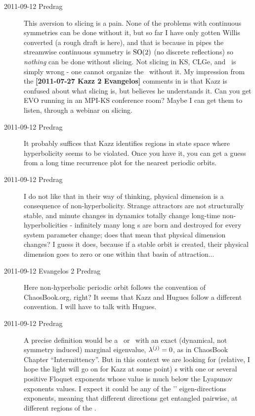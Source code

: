 \begin{description}
\item[2011-09-12 Predrag] This aversion to slicing is a pain. None of the
  problems with continuous symmetries can be done without it, but so far I
  have only gotten Willis converted
  {(a rough draft is here)}, and that is because in pipes the streamwise
  continuous symmetry is $\textrm{SO}(2)$ (no discrete reflections) so
  \emph{nothing} can be done without slicing. Not slicing in KS, CLGe, and
  \pCf\ is simply wrong - one cannot organize the \statesp\ without it. My
  impression from the {\bf [2011-07-27 Kazz 2 Evangelos]} comments in
   is that Kazz is confused about what slicing
  is, but believes he understands it. Can you get EVO running in an MPI-KS
  conference room? Maybe I can get them to listen, through a webinar on
  slicing.

\item[2011-09-12 Predrag] It probably suffices that Kazz identifies 	
  regions in state space where hyper\-bolicity seems to 	be violated. Once
  you have it, you can get a guess from a long time recurrence plot for the
  nearest periodic orbits.

\item[2011-09-12 Predrag] I do not like that in their way of thinking,
  physical dimension is a consequence of non-hyperbolicity. Strange
  attractors are not structurally stable, and minute changes in dynamics
  totally change long-time non-hyperbolicities - infinitely many long \po s
  are born and destroyed for every system parameter change; does that mean
  that physical dimension changes? I guess it does, because if a stable
  orbit is created, their physical dimension goes to zero or one within
  that basin of attraction...

\item[2011-09-12 Evangelos 2 Predrag] Here non-hyperbolic periodic orbit follows
  the convention of ChaosBook.org, right? It seems that Kazz and Hugues follow a
  different convention. I will have to talk with Hugues.

\item[2011-09-12 Predrag]                           \toCB
  A precise definition would be a \po\ or \rpo\ with an exact (dynamical,
  not symmetry induced) marginal eigenvalue, $\eigExp[j] = 0$, as in
  ChaosBook Chapter ``Intermittency''. But in this context we are looking
  for (relative, I hope the light will go on for Kazz at some point) \po s
  with one or several positive Floquet exponents whose value is much below
  the Lyapunov exponents values. I expect it could be any of the '{\entangled}'
  eigen-directions exponents, meaning that different directions get
  entangled pairwise, at different regions of the \statesp.


\end{description}
